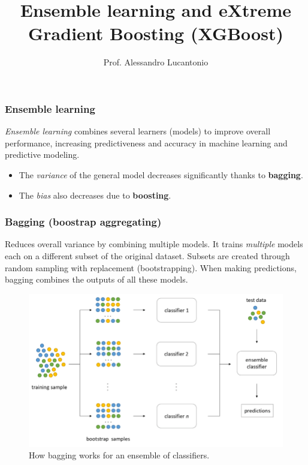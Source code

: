 \documentclass{beamer}
\title{Ensemble learning and eXtreme Gradient Boosting (XGBoost)}
\author{Prof. Alessandro Lucantonio}
\institute{Aarhus University}
\date{}
\begin{document}
	\frame{\titlepage}
	
		\begin{frame}
		\frametitle{Ensemble learning}
		
		\textit{Ensemble learning} combines several learners (models) to improve overall performance, increasing predictiveness and accuracy in machine learning and predictive modeling.
		
		\vspace{5mm}
		
		
		\begin{itemize}
		\item The \textit{variance} of the general model decreases significantly thanks to \textbf{bagging}.
		\item The \textit{bias} also decreases due to \textbf{boosting}.
		\end{itemize}
		
		
	\end{frame}
	
	\begin{frame}
		\frametitle{Bagging (boostrap aggregating)}
		Reduces overall variance by combining multiple models. It trains \textit{multiple} models each on a different subset of the original dataset. Subsets are created  through random sampling with replacement (bootstrapping). When making predictions, bagging combines the outputs of all these models. 

		\begin{figure}
			\centering
			\includegraphics[scale=.3]{images/bagging}
			\caption{How bagging works for an ensemble of classifiers.}
			\label{fig:bagging}
		\end{figure}
		
	\end{frame}
\end{document}
